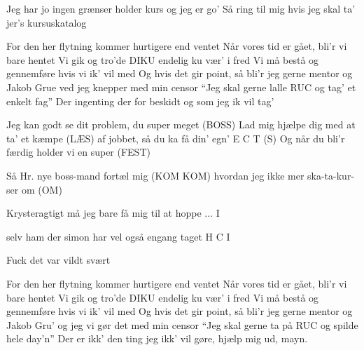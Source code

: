 \documentclass[a4paper,11pt]{article}
\begin{document}
\begin{song}
Jeg har jo ingen grænser holder kurs og jeg er go'
Så ring til mig hvis jeg skal ta' jer's kursuskatalog

For den her flytning kommer hurtigere end ventet
Når vores tid er gået, bli'r vi bare hentet
Vi gik og tro'de DIKU endelig ku vær' i fred
Vi må bestå og gennemføre hvis vi ik' vil med
Og hvis det gir point, så bli'r jeg gerne mentor
og Jakob Grue ved jeg knepper med min censor
“Jeg skal gerne lalle RUC og tag' et enkelt fag”
Der ingenting der for beskidt og som jeg ik vil tag'

Jeg kan godt se dit problem, du super meget (BOSS)
Lad mig hjælpe dig med at ta' et kæmpe (LÆS)
af jobbet, så du ka få din' egn' E C T (S)
Og når du bli'r færdig holder vi en super (FEST)

Så Hr. nye boss-mand fortæl mig (KOM KOM)
hvordan jeg ikke mer ska-ta-kur-ser om (OM)

Krysteragtigt må jeg bare få mig til at hoppe ... I

selv ham der simon har vel også engang taget H C I

Fuck det var vildt svært

For den her flytning kommer hurtigere end ventet
Når vores tid er gået, bli'r vi bare hentet
Vi gik og tro'de DIKU endelig ku vær' i fred
Vi må bestå og gennemføre hvis vi ik' vil med
Og hvis det gir point, så bli'r jeg gerne mentor
og Jakob Gru' og jeg vi gør det med min censor
“Jeg skal gerne ta på RUC og spilde hele day'n”
Der er ikk' den ting jeg ikk' vil gøre, hjælp mig ud, mayn.






\end{song}
\end{document}
